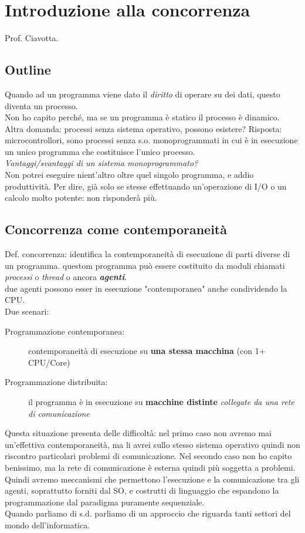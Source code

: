\chapter{Introduzione alla concorrenza}
Prof. Ciavotta.

\section{Outline}
Quando ad un programma viene dato il \textit{diritto} di operare su dei dati, questo diventa un processo.
\\Non ho capito perché, ma se un programma è statico il processo è dinamico.
\\Altra domanda: processi senza sistema operativo, possono esistere? Risposta: microcontrollori, sono processi senza s.o. monoprogrammati in cui è in esecuzione un unico programma che costituisce l'unico processo.
\\\textit{Vantaggi/svantaggi di un sistema monoprogrammato?}
\\Non potrei eseguire nient'altro oltre quel singolo programma, e addio produttività. Per dire, già solo se stesse effettuando un'operazione di I/O o un calcolo molto potente: non risponderà più.

\section{Concorrenza come contemporaneità}
Def. concorrenza: identifica la contemporaneità di esecuzione di parti diverse di un programma. questom programma può essere costituito da moduli chiamati \textit{processi} o \textit{thread} o ancora \textit{\textbf{
agenti}}.
\\due agenti possono esser in esecuzione "contemporanea" anche condividendo la CPU.
\\Due scenari:
\begin{description}
    \item[Programmazione contemporanea:] contemporaneità di esecuzione su \textbf{una stessa macchina} (con 1+ CPU/Core)
    \item[Programmazione distribuita:]  il programma è in esecuzione su \textbf{macchine distinte} \textit{collegate da una rete di comunicazione}
\end{description}
Questa situazione presenta delle difficoltà: nel primo caso non avremo mai un'effettiva contemporaneità, ma li avrei sullo stesso sistema operativo quindi non riscontro particolari problemi di comunicazione. Nel secondo caso non ho capito benissimo, ma la rete di comunicazione è esterna quindi più soggetta a problemi.
\\Quindi avremo meccanismi che permettono l'esecuzione e la comunicazione tra gli agenti, soprattutto forniti dal SO, e costrutti di linguaggio che espandono la programmazione dal paradigma puramente sequenziale.
\\Quando parliamo di s.d. parliamo di un approccio che riguarda tanti settori del mondo dell'informatica.

